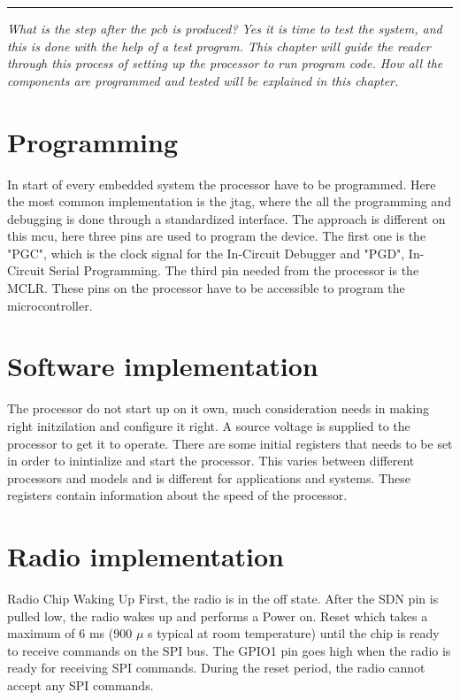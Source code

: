 \vspace{-10ex}%
\rule{\textwidth}{0.3pt}
\vspace{5ex}

\textit{
What is the step after the \gls{pcb} is produced? Yes it is time to test the system, and this is done with the help of a test program. This chapter will guide the reader through this process of setting up the processor to run program code. How all the components are programmed and tested will be explained in this chapter. 
}

\section{Programming} 
In start of every embedded system the processor have to be programmed. Here the most common implementation is the \gls{jtag}, where the all the programming and debugging is done through a standardized interface. The approach is different on this \gls{mcu}, here three pins are used to program the device. The first one is the "PGC", which is the clock signal for the In-Circuit Debugger and "PGD", In-Circuit Serial Programming. The third pin needed from the processor is the MCLR. These pins on the processor have to be accessible to program the microcontroller. %


\section{Software implementation}
The processor do not start up on it own, much consideration needs in making right initzilation and configure it right. A source voltage is supplied to the processor to get it to operate. There are some initial registers that needs to be set in order to inintialize and start the processor. This varies between different processors and models and is different for applications and systems. These registers contain information about the speed of the processor.    


\section{Radio implementation} %
Radio Chip Waking Up First,  the  radio  is  in  the  off  state. After  the  SDN  pin  is  pulled  low,  the  radio  wakes  up  and  performs  a  Power  on.
Reset  which  takes  a  maximum  of  6 ms  (900 $\mu$ s  typical  at  room  temperature)  until  the  chip  is  ready  to  receive commands on the SPI bus. The GPIO1 pin goes high when the radio is ready for receiving SPI commands. During the reset period, the radio cannot accept any SPI commands. 

